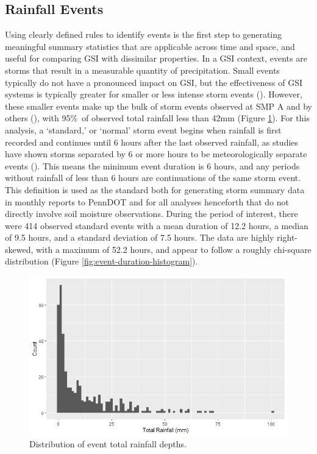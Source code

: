 \subsection{Rainfall Events}
Using clearly defined rules to identify events is the first step to generating meaningful summary statistics that are applicable across time and space, and useful for comparing GSI with dissimilar properties.
In a GSI context, events are storms that result in a measurable quantity of precipitation.
Small events typically do not have a pronounced impact on GSI, but the effectiveness of GSI systems is typically greater for smaller or less intense storm events (\cite{Liu2020}).
However, these smaller events make up the bulk of storm events observed at SMP A and by others (\cite{Albright2018}), with 95\%\ of observed total rainfall less than 42mm (Figure \ref{fig:event-total-rainfall}).
For this analysis, a `standard,' or `normal' storm event begins when rainfall is first recorded and continues until 6 hours after the last observed rainfall, as studies have shown storms separated by 6 or more hours to be meteorologically separate events (\cite{Wadzuk2017}).
This means the minimum event duration is 6 hours, and any periods without rainfall of less than 6 hours are continuations of the same storm event.
This definition is used as the standard both for generating storm summary data in monthly reports to PennDOT and for all analyses henceforth that do not directly involve soil moisture observations.
During the period of interest, there were 414 observed standard events with a mean duration of 12.2 hours, a median of 9.5 hours, and a standard deviation of 7.5 hours. The data are highly right-skewed, with a maximum of 52.2 hours, and appear to follow a roughly chi-square distribution (Figure \ref{fig:event-duration-histogram}).

\begin{figure}[ht]
	\centering
	\includegraphics[width=\textwidth]{gfx/chapter-data-analysis/hist_rainfall_depth.png}
	\caption{Distribution of event total rainfall depths.}
	\label{fig:event-total-rainfall}
\end{figure}

